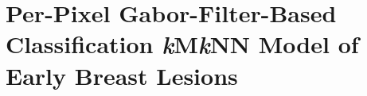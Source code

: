 \chapter{Per-Pixel Gabor-Filter-Based Classification \emph{k}M\emph{k}NN Model of Early Breast Lesions}




